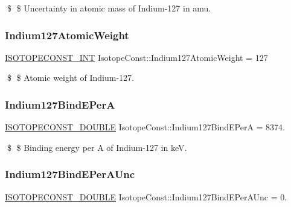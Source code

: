\$ \$ Uncertainty in atomic mass of Indium-\/127 in amu. \mbox{\label{group___isotope_const-_indium-_in127_ga6468d331b83bb8278b7ca0e872dfd293}} 
\subsubsection{\texorpdfstring{Indium127\+Atomic\+Weight}{Indium127AtomicWeight}}
{\footnotesize\ttfamily \mbox{\hyperlink{group___isotope_const-_macros_ga5f18360b3e99483a35c32d789e62621c}{I\+S\+O\+T\+O\+P\+E\+C\+O\+N\+S\+T\+\_\+\+I\+NT}} Isotope\+Const\+::\+Indium127\+Atomic\+Weight = 127}

\$ \$ Atomic weight of Indium-\/127. \mbox{\label{group___isotope_const-_indium-_in127_ga19d341facfd6fe65be390389865bff49}} 
\subsubsection{\texorpdfstring{Indium127\+Bind\+E\+PerA}{Indium127BindEPerA}}
{\footnotesize\ttfamily \mbox{\hyperlink{group___isotope_const-_macros_ga8f45a7272ce02c0b4c65c44636ed719a}{I\+S\+O\+T\+O\+P\+E\+C\+O\+N\+S\+T\+\_\+\+D\+O\+U\+B\+LE}} Isotope\+Const\+::\+Indium127\+Bind\+E\+PerA = 8374.}

\$ \$ Binding energy per A of Indium-\/127 in keV. \mbox{\label{group___isotope_const-_indium-_in127_gafda516dc382d25cce977da2150c1ac91}} 
\subsubsection{\texorpdfstring{Indium127\+Bind\+E\+Per\+A\+Unc}{Indium127BindEPerAUnc}}
{\footnotesize\ttfamily \mbox{\hyperlink{group___isotope_const-_macros_ga8f45a7272ce02c0b4c65c44636ed719a}{I\+S\+O\+T\+O\+P\+E\+C\+O\+N\+S\+T\+\_\+\+D\+O\+U\+B\+LE}} Isotope\+Const\+::\+Indium127\+Bind\+E\+Per\+A\+Unc = 0.}

